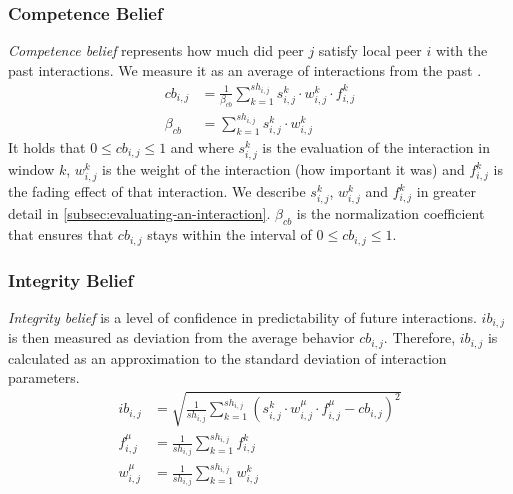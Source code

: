 \subsubsection{Competence Belief}
\textit{Competence belief} represents how much did peer $j$ satisfy local peer $i$ with the past interactions. We measure it as an average of interactions from the past \cite{sort}.
\begin{equation}
\begin{split}
    cb_{i,j} &= \frac{1}{\beta_{cb}} \sum_{k=1}^{sh_{i, j}} s_{i,j}^{k} \cdot w_{i,j}^{k} \cdot f_{i,j}^{k} \\
    \beta_{cb} &= \sum_{k=1}^{sh_{i, j}} s_{i,j}^{k} \cdot w_{i,j}^{k}
\end{split}
\end{equation}
It holds that $0 \leq cb_{i,j} \leq 1$ and where $s^{k}_{i,j}$ is the evaluation of the interaction in window $k$, $w^{k}_{i, j}$ is the weight of the interaction (how important it was) and $f^{k}_{i,j}$ is the fading effect of that interaction. We describe $s^{k}_{i,j}$, $w^{k}_{i,j}$ and $f^{k}_{i,j}$ in greater detail in \ref{subsec:evaluating-an-interaction}. 
$\beta_{cb}$ is the normalization coefficient that ensures that $cb_{i, j}$ stays within the interval of $0 \leq cb_{i,j} \leq 1$.

\subsubsection{Integrity Belief}
\textit{Integrity belief} is a level of confidence in predictability of future interactions. $ib_{i,j}$ is then measured as deviation from the average behavior $cb_{i,j}$. 
Therefore, $ib_{i,j}$ is calculated as an approximation to the standard deviation of interaction parameters\cite{sort}.
\begin{equation}
\begin{split}
    ib_{i,j} &= \sqrt{\frac{1}{sh_{i,j}} \sum_{k=1}^{sh_{i,j}}\left(s_{i,j}^{k} \cdot w_{i,j}^{\mu} \cdot f_{i,j}^{\mu} - cb_{i,j}\right)^{2}} \\
    f_{i,j}^{\mu} &= \frac{1}{sh_{i, j}} \sum_{k=1}^{sh_{i,j}} f^{k}_{i,j} \\
    w_{i,j}^{\mu} &= \frac{1}{sh_{i, j}} \sum_{k=1}^{sh_{i,j}} w^{k}_{i,j}
\end{split}
\end{equation}

